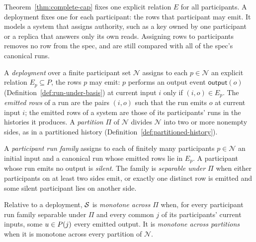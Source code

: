 Theorem~\ref{thm:complete-cap} fixes one explicit relation $E$ for all
participants.  A deployment fixes one for each participant: the rows that
participant may emit.  It models a system that assigns authority, such as a
key owned by one participant or a replica that answers only its own reads.
Assigning rows to participants removes no row from the spec, and
\commitments are still compared with all of the spec's canonical runs.

\begin{definition}
\label{def:deployment}\label{def:emitted-rows}
A \emph{deployment} over a finite participant set $\mathcal N$ assigns to each $p\in\mathcal N$
an explicit relation $E_p\subseteq P$, the rows $p$ may emit: $p$ performs an output event
$\mathsf{output}(o)$ (Definition~\ref{def:run-under-basis}) at current input
$i$ only if $(i,o)\in E_p$.  The \emph{emitted rows} of a run are the
pairs $(i,o)$ such that the run emits $o$ at current input $i$; the emitted
rows of a system are those of its participants' runs in the histories it
produces.  A \emph{partition} $\Pi$ of $\mathcal N$ divides $\mathcal N$ into
two or more nonempty sides, as in a partitioned history
(Definition~\ref{def:partitioned-history}).
\end{definition}

\begin{definition}
\label{def:participant-run-family}
A \emph{participant run family} assigns to each of finitely many participants
$p\in\mathcal N$ an initial input and a canonical run whose emitted rows lie in $E_p$.
A participant whose run emits no output is \emph{silent}.  The family is
\emph{separable under $\Pi$} when either participants on at least two
sides emit, or exactly one distinct row is emitted and some silent
participant lies on another side.
\end{definition}

\begin{definition}
\label{def:monotone-across-partitions}
Relative to a deployment, $\mathcal{S}$ is \emph{monotone across $\Pi$} when, for
every participant run family separable under $\Pi$ and every common \indesc $j$
of its participants' current inputs, some $u\in P(j)$ \outrel every
emitted output.  It is \emph{monotone across partitions} when it is monotone
across every partition of $\mathcal N$.
\end{definition}

